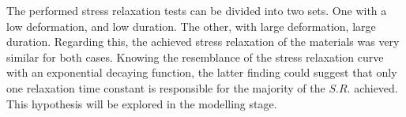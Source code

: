 The performed stress relaxation tests can be divided into two sets. One with a low deformation, and low duration. The other, with large deformation, large duration. Regarding this, the achieved stress relaxation of the materials was very similar for both cases. Knowing the resemblance of the stress relaxation curve with an exponential decaying function, the latter finding could suggest that only one relaxation time constant is responsible for the majority of the $S.R.$ achieved.  This hypothesis will be explored in the modelling stage. 

